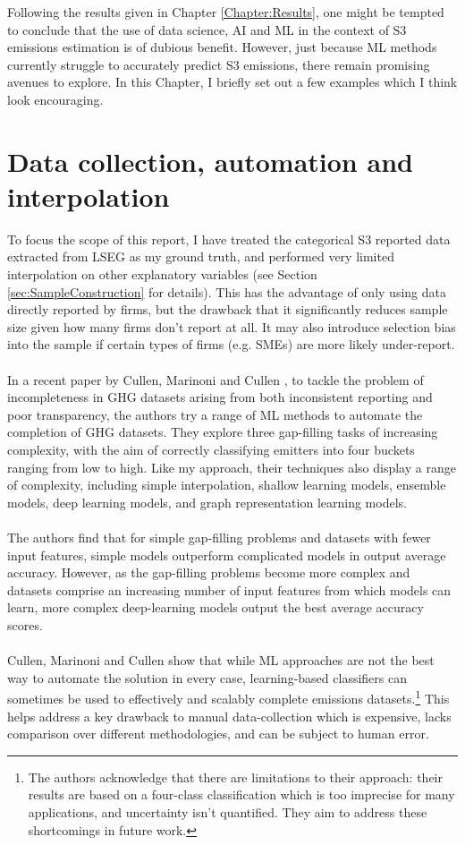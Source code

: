 \documentclass[12pt,twoside]{report}
\begin{document}
Following the results given in Chapter \ref{Chapter:Results}, one might be tempted to conclude that the use of data science, AI and ML in the context of S3 emissions estimation is of dubious benefit. However, just because ML methods currently struggle to accurately predict S3 emissions, there remain promising avenues to explore. In this Chapter, I briefly set out a few examples which I think look encouraging.

\section{Data collection, automation and interpolation}\label{sec:FurtherApplication1}

To focus the scope of this report, I have treated the categorical S3 reported data extracted from LSEG as my ground truth, and performed very limited interpolation on other explanatory variables (see Section \ref{sec:SampleConstruction} for details). This has the advantage of only using data directly reported by firms, but the drawback that it significantly reduces sample size given how many firms don't report at all. It may also introduce selection bias into the sample if certain types of firms (e.g. SMEs) are more likely under-report. 
\\\\
In a recent paper by Cullen, Marinoni and Cullen  \cite{CullenMarinoniCullen2024}, to tackle the problem of incompleteness in GHG datasets arising from both inconsistent reporting and poor transparency, the authors try a range of ML methods to automate the completion of GHG datasets. They explore three gap-filling tasks of increasing complexity, with the aim of correctly classifying emitters into four buckets ranging from low to high. Like my approach, their techniques also display a range of complexity, including simple interpolation, shallow learning models, ensemble models, deep learning models, and graph representation learning models. 
\\\\
The authors find that for simple gap-filling problems and datasets with fewer input features, simple models outperform complicated models in output average accuracy. However, as the gap-filling problems become more complex and datasets comprise an increasing number of input features from which models can learn, more complex deep-learning models output the best average accuracy scores.
\\\\
Cullen, Marinoni and Cullen show that while ML approaches are not the best way to automate the solution in every case, learning-based classifiers can sometimes be used to effectively and scalably complete emissions datasets.\footnote{The authors acknowledge that there are limitations to their approach: their results are based on a four-class classification which is too imprecise for many applications, and uncertainty isn't quantified. They aim to address these shortcomings in future work.} This helps address a key drawback to manual data-collection which is expensive, lacks comparison over different methodologies, and can be subject to human error.
\end{document}
